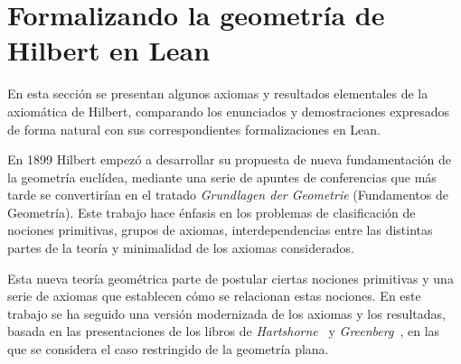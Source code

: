 \section{Formalizando la geometría de Hilbert en Lean}


En esta sección se presentan algunos axiomas y resultados elementales de la
axiomática de Hilbert, comparando los enunciados y demostraciones expresados de
forma natural con sus correspondientes formalizaciones en Lean.

En 1899 Hilbert empezó a desarrollar su propuesta de nueva fundamentación de la
geometría euclídea, mediante una serie de apuntes de conferencias que más tarde
se convertirían en el tratado \textit{Grundlagen der Geometrie} (Fundamentos de
Geometría). Este trabajo hace énfasis en los problemas de clasificación de
nociones primitivas, grupos de axiomas, interdependencias entre las distintas
partes de la teoría y minimalidad de los axiomas considerados.

Esta nueva teoría geométrica parte de postular ciertas nociones primitivas y una
serie de axiomas que establecen cómo se relacionan estas nociones. En este
trabajo se ha seguido una versión modernizada de los axiomas y los resultadas,
basada en las presentaciones de los libros de
\textit{Hartshorne}~\cite{hartshorneGeometryEuclid2000} y
\textit{Greenberg}~\cite{greenbergEuclideanNonEuclideanGeometries1993}, en las
que se considera el caso restringido de la geometría plana.

